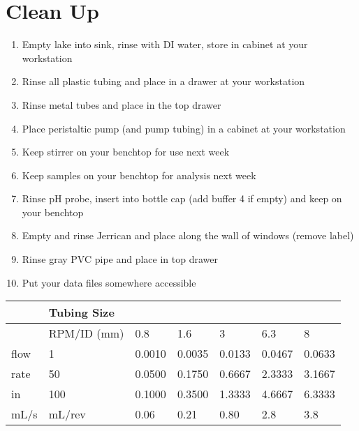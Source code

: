 \documentclass[letterpaper,10pt,english]{sphinxmanual}
\begin{document}
\section{Clean Up}
\label{\detokenize{Acid_Rain/Acid_Rain:clean-up}}\label{\detokenize{Acid_Rain/Acid_Rain:heading-acid-rain-clean-up}}\begin{enumerate}
\item {} 
Empty lake into sink, rinse with DI water, store in cabinet at your workstation

\item {} 
Rinse all plastic tubing and place in a drawer at your workstation

\item {} 
Rinse metal tubes and place in the top drawer

\item {} 
Place peristaltic pump (and pump tubing) in a cabinet at your workstation

\item {} 
Keep stirrer on your benchtop for use next week

\item {} 
Keep samples on your benchtop for analysis next week

\item {} 
Rinse pH probe, insert into bottle cap (add buffer 4 if empty) and keep on your benchtop

\item {} 
Empty and rinse Jerrican and place along the wall of windows (remove label)

\item {} 
Rinse gray PVC pipe and place in top drawer

\item {} 
Put your data files somewhere accessible

\end{enumerate}


\begin{savenotes}\sphinxattablestart
\centering
{}
\label{\detokenize{Acid_Rain/Acid_Rain:id3}}\label{\detokenize{Acid_Rain/Acid_Rain:table-acid-pump-tubing}}
\sphinxaftercaption
\begin{tabulary}{\linewidth}[t]{|T|T|T|T|T|T|T|}
\hline
\sphinxstyletheadfamily &\sphinxstyletheadfamily 
Tubing Size
&
&
&
&
&
\\
\hline&
RPM/ID (mm)
&
0.8
&
1.6
&
3
&
6.3
&
8
\\
\hline
flow
&
1
&
0.0010
&
0.0035
&
0.0133
&
0.0467
&
0.0633
\\
\hline
rate
&
50
&
0.0500
&
0.1750
&
0.6667
&
2.3333
&
3.1667
\\
\hline
in
&
100
&
0.1000
&
0.3500
&
1.3333
&
4.6667
&
6.3333
\\
\hline
mL/s
&
mL/rev
&
0.06
&
0.21
&
0.80
&
2.8
&
3.8
\\
\hline
\end{tabulary}
\par
\sphinxattableend\end{savenotes}
\end{document}
